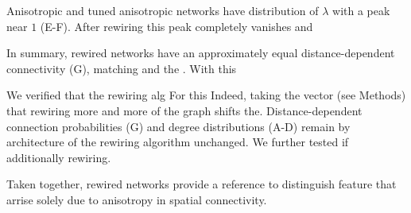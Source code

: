 Anisotropic and tuned anisotropic networks have distribution of
$\lambda$ with a peak near $1$ (E-F). After
rewiring this peak completely vanishes and

In summary, rewired networks have an approximately equal
distance-dependent connectivity (G), matching
and the . With this


We verified that the rewiring alg For
this Indeed, taking the vector (see Methods) that rewiring more and
more of the graph shifts the. Distance-dependent connection
probabilities (G) and degree distributions
(A-D) remain by architecture of the rewiring
algorithm unchanged. We further tested if additionally rewiring.

Taken together, rewired networks provide a reference to distinguish
feature that arrise solely due to anisotropy in spatial connectivity.






